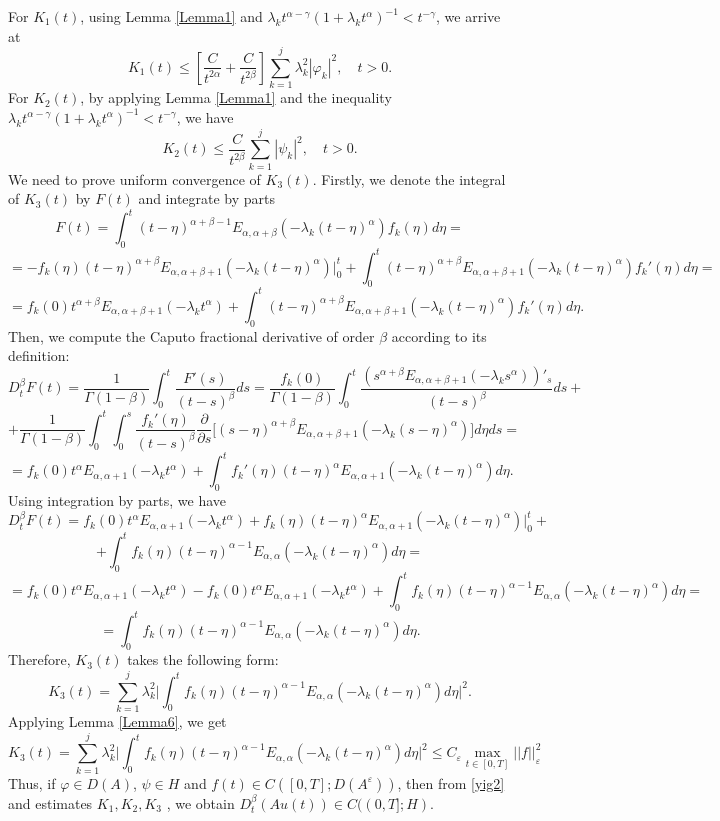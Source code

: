 \documentclass{amsart}
\numberwithin{equation}{section}
\begin{document}
For $K_1(t)$, using Lemma \ref{Lemma1} and $\lambda_k t^{\alpha-\gamma}(1+\lambda_k t^\alpha)^{-1}<t^{-\gamma}$, we arrive at
$$
K_1(t) \leq \left[\frac{C}{t^{2\alpha}}+\frac{C}{t^{2\beta}}\right]\sum_{k=1}^j \lambda_k^2 |\varphi_k|^2 , \quad t>0.
$$
For $K_2(t)$, by applying Lemma \ref{Lemma1} and the inequality $\lambda_k t^{\alpha-\gamma}(1+\lambda_k t^\alpha)^{-1}<t^{-\gamma}$, we have
$$
K_2(t)\leq \frac{C}{t^{2\beta}}\sum_{k=1}^j |\psi_k|^2 , \quad t>0.$$
We need to prove uniform convergence of  $K_3(t)$. Firstly, we denote the integral of $K_3(t)$ by $F(t)$ and  integrate by parts
$$
F(t)=\int_0^t (t-\eta)^{\alpha+\beta-1}E_{\alpha,\alpha+\beta}(-\lambda_k(t-\eta)^\alpha)f_k(\eta) d\eta=
$$
$$
=-f_k(\eta)(t-\eta)^{\alpha+\beta}E_{\alpha,\alpha+\beta+1}(-\lambda_k(t-\eta)^\alpha)\bigg|_0^t+\int_0^t (t-\eta)^{\alpha+\beta}E_{\alpha,\alpha+\beta+1}(-\lambda_k(t-\eta)^\alpha)f_k'(\eta) d\eta=$$
$$
=f_k(0)t^{\alpha+\beta}E_{\alpha,\alpha+\beta+1}(-\lambda_k t^\alpha)+\int_0^t (t-\eta)^{\alpha+\beta}E_{\alpha,\alpha+\beta+1}(-\lambda_k(t-\eta)^\alpha)f_k'(\eta) d\eta .
$$
Then, we compute the Caputo fractional derivative of order $\beta$ according to its definition:
$$
D_t^\beta F(t)=\frac{1}{\Gamma(1-\beta)}\int_0^t \frac{F'(s)}{(t-s)^\beta} ds=\frac{f_k(0)}{\Gamma(1-\beta)} \int_0^t \frac{(s^{\alpha+\beta}E_{\alpha,\alpha+\beta+1}(-\lambda_ks^\alpha))'_s}{(t-s)^\beta} ds+
$$
$$
+\frac{1}{\Gamma(1-\beta)}\int_0^t\int_0^s\frac{f_k'(\eta)}{(t-s)^\beta} \frac{\partial}{\partial s}\bigg[(s-\eta)^{\alpha+\beta}E_{\alpha,\alpha+\beta+1}(-\lambda_k(s-\eta)^\alpha)\bigg] d\eta ds=
$$
$$
=f_k(0)t^\alpha E_{\alpha,\alpha+1}(-\lambda_k t^\alpha)+\int_0^t f_k'(\eta)(t-\eta)^\alpha E_{\alpha,\alpha+1}(-\lambda_k(t-\eta)^\alpha) d\eta .
$$
Using integration by parts, we have
$$D_t^\beta F(t)=f_k(0)t^\alpha E_{\alpha,\alpha+1}(-\lambda_k t^\alpha)+f_k(\eta)(t-\eta)^\alpha E_{\alpha,\alpha+1}(-\lambda_k(t-\eta)^\alpha)\bigg|_0^t+$$
$$+\int_0^tf_k(\eta)(t-\eta)^{\alpha-1}E_{\alpha,\alpha}(-\lambda_k(t-\eta)^\alpha)d\eta=$$
$$=f_k(0)t^\alpha E_{\alpha,\alpha+1}(-\lambda_k t^\alpha)-f_k(0)t^\alpha E_{\alpha,\alpha+1}(-\lambda_k t^\alpha)+\int_0^tf_k(\eta)(t-\eta)^{\alpha-1}E_{\alpha,\alpha}(-\lambda_k(t-\eta)^\alpha)d\eta=$$$$=\int_0^tf_k(\eta)(t-\eta)^{\alpha-1}E_{\alpha,\alpha}(-\lambda_k(t-\eta)^\alpha)d\eta.$$
Therefore, $K_3(t)$  takes the following form:
$$
K_3(t)=\sum_{k=1}^j \lambda_k^2\bigg|\int_0^tf_k(\eta)(t-\eta)^{\alpha-1}E_{\alpha,\alpha}(-\lambda_k(t-\eta)^\alpha)d\eta\bigg|^2.
$$
Applying Lemma \ref{Lemma6}, we  get
$$K_3(t)=\sum_{k=1}^j \lambda_k^2\bigg|\int_0^tf_k(\eta)(t-\eta)^{\alpha-1}E_{\alpha,\alpha}(-\lambda_k(t-\eta)^\alpha)d\eta\bigg|^2\leq C_\varepsilon \max_{t\in[0,T]}||f||_\varepsilon^2$$
Thus, if $\varphi\in D(A)$, $\psi \in H$ and $f(t) \in C([0,T];D(A^\varepsilon))$, then from \eqref{yig2} and estimates $K_1,K_2,K_3$ , we obtain $D_t^\beta(Au(t)) \in C((0,T];H).$
\end{document}
